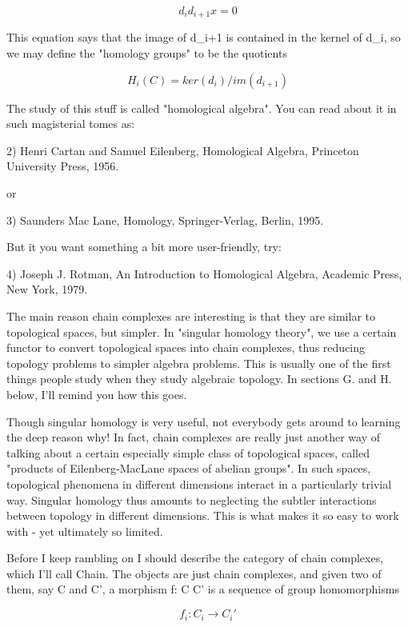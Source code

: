 $$

                        d_{i} d_{i+1} x = 0
$$
    
This equation says that the image of d_{i+1} is contained
in the kernel of d_{i}, so we may define the "homology groups" to be the
quotients


$$

                 H_{i}(C) = ker(d_{i}) / im(d_{i+1})   
$$
    
The study of this stuff is called "homological algebra".  You can read 
about it in such magisterial tomes as:

2) Henri Cartan and Samuel Eilenberg, Homological Algebra, Princeton
University Press, 1956.

or 

3) Saunders Mac Lane, Homology, Springer-Verlag, Berlin, 1995.

But it you want something a bit more user-friendly, try:

4) Joseph J. Rotman, An Introduction to Homological Algebra, 
Academic Press, New York, 1979.

The main reason chain complexes are interesting is that they are similar
to topological spaces, but simpler.  In "singular homology theory", we
use a certain functor to convert topological spaces into chain
complexes, thus reducing topology problems to simpler algebra problems.
This is usually one of the first things people study when they study
algebraic topology.  In sections G. and H. below, I'll remind you how
this goes.

Though singular homology is very useful, not everybody gets around to
learning the deep reason why!  In fact, chain complexes are really just 
another way
of talking about a certain especially simple class of topological spaces, called
"products of Eilenberg-MacLane spaces of abelian groups".  In such
spaces, topological phenomena in different dimensions interact in a
particularly trivial way.  Singular homology thus amounts to neglecting
the subtler interactions between topology in different dimensions.  This
is what makes it so easy to work with - yet ultimately so limited.
 
Before I keep rambling on I should describe the category of chain
complexes, which I'll call Chain.  The objects are just chain complexes,
and given two of them, say C and C', a morphism f: C \to  C' is a sequence
of group homomorphisms 

$$

             f_{i}: C_{i} \to  C_{i}'
$$
    

